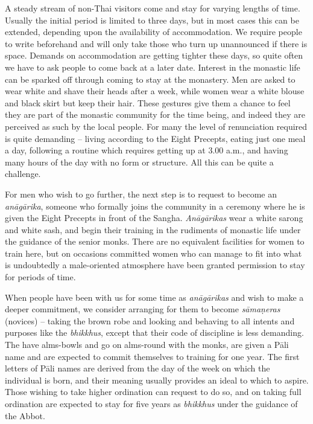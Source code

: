 A steady stream of non-Thai visitors come and stay for varying lengths
of time. Usually the initial period is limited to three days, but in
most cases this can be extended, depending upon the availability of
accommodation. We require people to write beforehand and will only take
those who turn up unannounced if there is space. Demands on
accommodation are getting tighter these days, so quite often we have to
ask people to come back at a later date. Interest in the monastic life
can be sparked off through coming to stay at the monastery. Men are
asked to wear white and shave their heads after a week, while women
wear a white blouse and black skirt but keep their hair. These gestures
give them a chance to feel they are part of the monastic community for
the time being, and indeed they are perceived as such by the local
people. For many the level of renunciation required is quite demanding
-- living according to the Eight Precepts, eating just one meal a day, 
following a routine which requires getting up at 3.00 a.m., and having
many hours of the day with no form or structure. All this can be quite a
challenge. 

For men who wish to go further, the next step is to request to become an
\emph{anāgārika}, someone who formally joins the community in a ceremony
where he is given the Eight Precepts in front of the Sangha. 
\emph{Anāgārikas} wear a white sarong and white sash, and begin their
training in the rudiments of monastic life under the guidance of the
senior monks. There are no equivalent facilities for women to train
here, but on occasions committed women who can manage to fit into what
is undoubtedly a male-oriented atmosphere have been granted permission
to stay for periods of time. 

When people have been with us for some time as \emph{anāgārikas} and
wish to make a deeper commitment, we consider arranging for them to
become \emph{sāmaṇeras} (novices) -- taking the brown robe and looking
and behaving to all intents and purposes like the \emph{bhikkhus}, 
except that their code of discipline is less demanding. The have
alms-bowls and go on alms-round with the monks, are given a Pāli name
and are expected to commit themselves to training for one year.
The first letters of Pāli names are derived from the
day of the week on which the individual is born, and their meaning
usually provides an ideal to which to aspire.
Those wishing to take higher ordination can request to do so, and on taking
full ordination are expected to stay for five years as \emph{bhikkhus}
under the guidance of the Abbot. 

